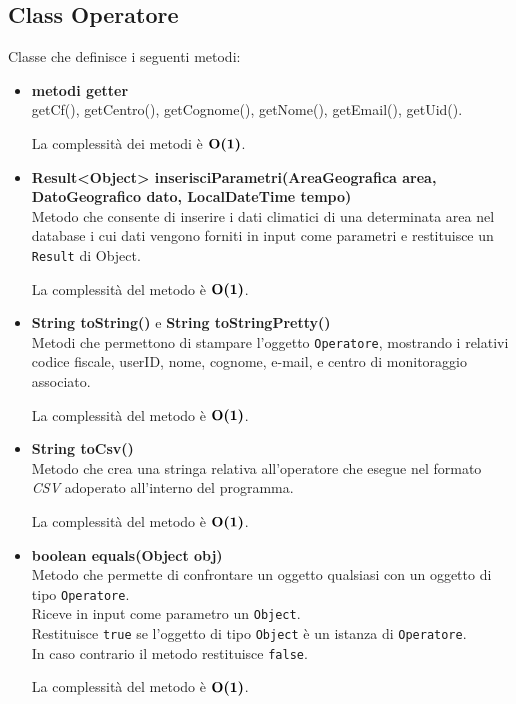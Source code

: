\documentclass[a4paper, 12pt]{scrreprt}
\begin{document}
			\subsection{Class Operatore}
			Classe che definisce i seguenti metodi:\\
			\begin{itemize}
				\item \textbf{metodi getter}
				\\getCf(), getCentro(), getCognome(), getNome(), getEmail(), getUid().

				La complessit\`a dei metodi \`e $\mathbf{O}\textbf{(1)}$.

				\item \textbf{Result<Object> inserisciParametri(AreaGeografica area, DatoGeografico dato, LocalDateTime tempo)}
				\\Metodo che consente di inserire i dati climatici di una determinata area nel database i cui dati vengono forniti in input come parametri e restituisce un \verb!Result! di Object.

				La complessit\`a del metodo \`e $\mathbf{O}\textbf{(1)}$.

				\item \textbf{String toString()} e \textbf{String toStringPretty()}
				\\Metodi che permettono di stampare l'oggetto \verb!Operatore!, mostrando i relativi codice fiscale, userID, nome, cognome, e-mail, e centro di monitoraggio associato.

				La complessit\`a del metodo \`e $\mathbf{O}\textbf{(1)}$.

				\item \textbf{String toCsv()}
				\\Metodo che crea una stringa relativa all'operatore che esegue nel formato \textsl{CSV} adoperato all'interno del programma.

				La complessit\`a del metodo \`e $\mathbf{O}\textbf{(1)}$.

				\item \textbf{boolean equals(Object obj)}
				\\Metodo che permette di confrontare un oggetto qualsiasi con un oggetto di tipo \verb!Operatore!.
				\\Riceve in input come parametro un \verb!Object!.
				\\Restituisce \verb!true! se l'oggetto di tipo \verb!Object! \`e un istanza di \verb!Operatore!.
				\\In caso contrario il metodo restituisce \verb!false!.

				La complessit\`a del metodo \`e $\mathbf{O}\textbf{(1)}$.

			\end{itemize}
\pagebreak
\end{document}
